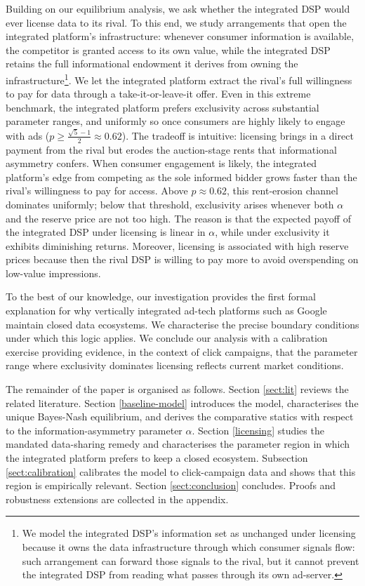 \documentclass[11pt]{article}
\theoremstyle{plain}
\theoremstyle{definition}
\theoremstyle{plain}
\theoremstyle{plain}
\theoremstyle{plain}
\theoremstyle{plain}
\numberwithin{equation}{section}
\begin{document}
\noindent Building on our equilibrium analysis, we ask whether the integrated DSP would ever license data to its rival. To this end, we study arrangements that open the integrated platform's infrastructure: whenever consumer information is available, the competitor is granted access to its own value, while the integrated DSP retains the full informational endowment it derives from owning the infrastructure\footnote{We model the integrated DSP's information set as unchanged under licensing because it owns the data infrastructure through which consumer signals flow: such arrangement can forward those signals to the rival, but it cannot prevent the integrated DSP from reading what passes through its own ad-server.}. We let the integrated platform extract the rival's full willingness to pay for data through a take-it-or-leave-it offer. Even in this extreme benchmark, the integrated platform prefers exclusivity across substantial parameter ranges, and uniformly so once consumers are highly likely to engage with ads ($p \geq \frac{\sqrt{5}-1}{2} \approx 0.62$). The tradeoff is intuitive: licensing brings in a direct payment from the rival but erodes the auction-stage rents that informational asymmetry confers. When consumer engagement is likely, the integrated platform's edge from competing as the sole informed bidder grows faster than the rival's willingness to pay for access. Above $ p \approx 0.62 $, this rent-erosion channel dominates uniformly; below that threshold, exclusivity arises whenever both $ \alpha $ and the reserve price are not too high. The reason is that the expected payoff of the integrated DSP under licensing is linear in $ \alpha $, while under exclusivity it exhibits diminishing returns. Moreover, licensing is associated with high reserve prices because then the rival DSP is willing to pay more to avoid overspending on low-value impressions.

To the best of our knowledge, our investigation provides the first formal explanation for why vertically integrated ad-tech platforms such as Google maintain closed data ecosystems. We characterise the precise boundary conditions under which this logic applies. We conclude our analysis with a calibration exercise providing evidence, in the context of click campaigns, that the parameter range where exclusivity dominates licensing reflects current market conditions.

\vspace{2mm}

\noindent The remainder of the paper is organised as follows. Section \ref{sect:lit} reviews the related literature. Section \ref{baseline-model} introduces the model, characterises the unique Bayes-Nash equilibrium, and derives the comparative statics with respect to the information-asymmetry parameter $\alpha$. Section \ref{licensing} studies the mandated data-sharing remedy and characterises the parameter region in which the integrated platform prefers to keep a closed ecosystem. Subsection \ref{sect:calibration} calibrates the model to click-campaign data and shows that this region is empirically relevant. Section \ref{sect:conclusion} concludes. Proofs and robustness extensions are collected in the appendix. 
\end{document}
